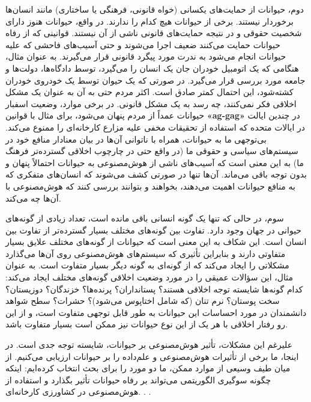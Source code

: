 دوم، حیوانات از حمایت‌های یکسانی (خواه قانونی، فرهنگی یا ساختاری) مانند انسان‌ها برخوردار نیستند.
برخی از حیوانات هیچ کدام را ندارند.
در واقع، حیوانات هنوز دارای شخصیت حقوقی و در نتیجه حمایت‌های قانونی ناشی از آن نیستند.
قوانینی که از رفاه حیوانات حمایت می‌کنند ضعیف اجرا می‌شوند و حتی آسیب‌های فاحشی که علیه حیوانات انجام می‌شود به ندرت مورد پیگرد قانونی قرار می‌گیرند.
به عنوان مثال، هنگامی که یک اتومبیل خودران جان یک انسان را می‌گیرد، توسط دادگاه‌ها، دولت‌ها و جامعه مورد بررسی قرار می‌گیرد.
در صورتی که یک حیوان توسط یک خودروی خودران کشته‌شود، این احتمال کمتر صادق است.
اکثر مردم حتی به آن به عنوان یک مشکل اخلاقی فکر نمی‌کنند، چه رسد به یک مشکل قانونی.
در برخی موارد، وضعیت اسفبار حیوانات عمداً از مردم پنهان می‌شود، برای مثال با قوانین \textenglish{\textbf{«ag-gag»}} در چندین ایالت در ایالات متحده که استفاده از تحقیقات مخفی علیه مزارع کارخانه‌ای را ممنوع می‌کند.
بی‌توجهی ما به حیوانات، همراه با ناتوانی آن‌ها در بیان معنادار منافع خود در سیستم‌های سیاسی و حقوقی ما (در واقع حتی در چارچوب اخلاقی گسترده‌تر فرهنگ ما) به این معنی است که آسیب‌های ناشی از هوش‌مصنوعی به حیوانات احتمالاً پنهان و بدون توجه باقی می‌ماند.
آن‌ها تنها در صورتی کشف می‌شوند که انسان‌های متفکری که به منافع حیوانات اهمیت می‌دهند، بخواهند و بتوانند بررسی کنند که هوش‌مصنوعی با آن‌ها چه می‌کند.

سوم، در حالی که تنها یک گونه انسانی باقی مانده است، تعداد زیادی از گونه‌های حیوانی در جهان وجود دارد.
تفاوت بین گونه‌های مختلف بسیار گسترده‌تر از تفاوت بین انسان است.
این شکاف به این معنی است که حیوانات از گونه‌های مختلف علایق بسیار متفاوتی دارند و بنابراین تأثیری که سیستم‌های هوش‌مصنوعی روی آن‌ها می‌گذارد مشکلاتی را ایجاد می‌کند که از گونه‌ای به گونه دیگر بسیار متفاوت است.
به عنوان مثال، این سؤالات عمیقی را در مورد وضعیت اخلاقی گونه‌های مختلف ایجاد می‌کند: کدام گونه‌ها شایسته توجه اخلاقی هستند؟ پستانداران؟ پرنده‌ها؟ خزندگان؟ دوزیستان؟ سخت پوستان؟ نرم تنان (که شامل اختاپوس می‌شود)؟ حشرات؟ سطح شواهد دانشمندان در مورد احساسات این حیوانات به طور قابل توجهی متفاوت است، و از این رو رفتار اخلاقی با هر یک از این نوع حیوانات نیز ممکن است بسیار متفاوت باشد.

علیرغم این مشکلات، تأثیر هوش‌مصنوعی بر حیوانات، شایسته توجه جدی است.
در اینجا، ما برخی از تأثیرات هوش‌مصنوعی و علم‌داده را بر حیوانات ارزیابی می‌کنیم.
از میان طیف وسیعی از موارد ممکن، ما دو مورد را برای بحث انتخاب کرده‌ایم: اینکه چگونه سوگیری الگوریتمی می‌تواند بر رفاه حیوانات تأثیر بگذارد و استفاده از هوش‌مصنوعی در کشاورزی کارخانه‌ای.
. .
\newline
\newline


